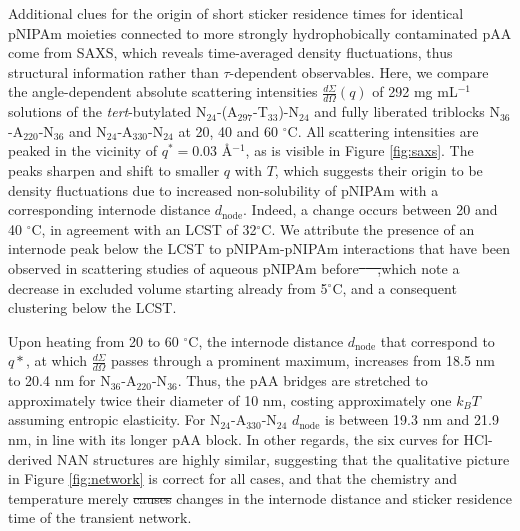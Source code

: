 \documentclass{article}
\providecommand{\DIFadd}[1]{{\protect\color{blue}\uwave{#1}}} %
\providecommand{\DIFdel}[1]{{\protect\color{red}\sout{#1}}}                      %
\providecommand{\DIFaddbegin}{} %
\providecommand{\DIFaddend}{} %
\providecommand{\DIFdelbegin}{} %
\providecommand{\DIFdelend}{} %
\begin{document}
Additional clues for the origin of short sticker residence times for identical pNIPAm moieties
connected to more strongly hydrophobically contaminated pAA come from SAXS, which 
reveals time-averaged 
density fluctuations, thus structural information rather than $\tau$-dependent observables.
Here, we compare the angle-dependent absolute scattering intensities $\frac{d\Sigma}{d\Omega}(q)$ 
of 292 mg mL$^{-1}$ solutions of 
the \emph{tert}-butylated N$_\mathrm{24}$-(A$_\mathrm{297}$-T$_\mathrm{33}$)-N$_\mathrm{24}$ 
and fully liberated triblocks 
N$_\mathrm{36}$-A$_\mathrm{220}$-N$_\mathrm{36}$ and 
N$_\mathrm{24}$-A$_\mathrm{330}$-N$_\mathrm{24}$ at
20, 40 and 60 $^\circ\mathrm{C}$. All scattering intensities are peaked in the 
vicinity of $q^*=$0.03 \AA$^{-1}$, as is
visible in Figure \ref{fig:saxs}. The peaks sharpen and shift to smaller $q$ with $T$,
which suggests their origin to be density fluctuations due to increased non-solubility 
of pNIPAm with a corresponding internode distance $d_\mathrm{node}$.
Indeed, a change occurs between 20 and 40 $^\circ\mathrm{C}$, in agreement with an 
LCST of 32$^\circ\mathrm{C}$. We attribute the presence of an internode peak below the 
LCST to pNIPAm-pNIPAm interactions
that have been observed in scattering studies of aqueous pNIPAm before\DIFdelbegin \DIFdel{\mbox{%
\cite{Lang2017}
}%
,}\DIFdelend \DIFaddbegin \DIFadd{,\mbox{%
\cite{Lang2017}
}%
}\DIFaddend which note a decrease in excluded 
volume starting already from 5$^\circ\mathrm{C}$, and a consequent clustering below the 
LCST.\cite{Kawaguchi2009} 

Upon heating from 20 to 60 $^\circ\mathrm{C}$, the internode distance $d_\mathrm{node}$ that 
correspond to $q*$, at which $\frac{d\Sigma}{d\Omega}$ passes through a prominent maximum, 
increases from 18.5 nm to 20.4 nm for N$_\mathrm{36}$-A$_\mathrm{220}$-N$_\mathrm{36}$. Thus,
the pAA bridges are stretched to approximately twice their diameter of 10 nm, costing
approximately one $k_BT$ assuming entropic elasticity. For  
N$_\mathrm{24}$-A$_\mathrm{330}$-N$_\mathrm{24}$ $d_\mathrm{node}$ is between 19.3 nm and 21.9 nm,
in line with its longer pAA block. In other regards, the six curves for HCl-derived NAN 
structures are highly similar, suggesting that the qualitative picture in Figure \ref{fig:network}
is correct for all cases, and that the chemistry and temperature merely \DIFdelbegin \DIFdel{causes }\DIFdelend \DIFaddbegin \DIFadd{cause }\DIFaddend changes
in the internode distance and sticker residence time of the transient network.
\end{document}
